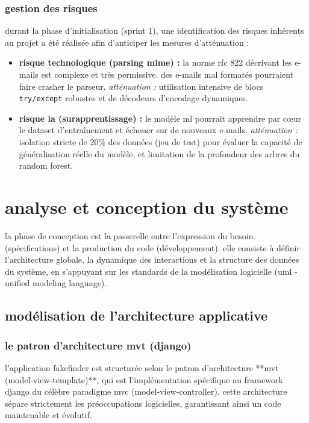\documentclass[12pt,a4paper]{report}
\begin{document}
\subsection{gestion des risques}
durant la phase d'initialisation (sprint 1), une identification des risques inhérents au projet a été réalisée afin d'anticiper les mesures d'atténuation :
\begin{itemize}
    \item \textbf{risque technologique (parsing mime) :} la norme rfc 822 décrivant les e-mails est complexe et très permissive. des e-mails mal formatés pourraient faire crasher le parseur. \textit{atténuation :} utilisation intensive de blocs \texttt{try/except} robustes et de décodeurs d'encodage dynamiques.
    \item \textbf{risque ia (surapprentissage) :} le modèle ml pourrait apprendre par cœur le dataset d'entraînement et échouer sur de nouveaux e-mails. \textit{atténuation :} isolation stricte de 20\% des données (jeu de test) pour évaluer la capacité de généralisation réelle du modèle, et limitation de la profondeur des arbres du random forest.
\end{itemize}


\chapter{analyse et conception du système}

la phase de conception est la passerelle entre l'expression du besoin (spécifications) et la production du code (développement). elle consiste à définir l'architecture globale, la dynamique des interactions et la structure des données du système, en s'appuyant sur les standards de la modélisation logicielle (uml - unified modeling language).

\section{modélisation de l'architecture applicative}

\subsection{le patron d'architecture mvt (django)}
l'application fakefinder est structurée selon le patron d'architecture **mvt (model-view-template)**, qui est l'implémentation spécifique au framework django du célèbre paradigme mvc (model-view-controller). cette architecture sépare strictement les préoccupations logicielles, garantissant ainsi un code maintenable et évolutif.
\end{document}
